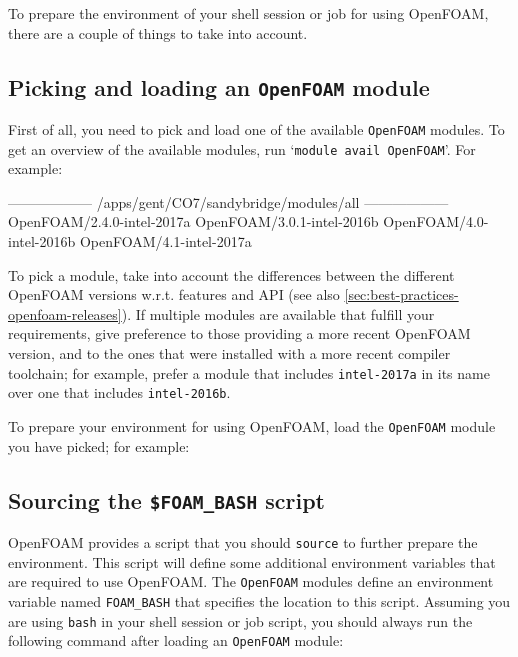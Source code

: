 To prepare the environment of your shell session or job for using OpenFOAM,
there are a couple of things to take into account.

\subsection{Picking and loading an \texttt{OpenFOAM} module}
First of all, you need to pick and load one of the available \lstinline|OpenFOAM| modules.
To get an overview of the available modules, run `\lstinline|module avail OpenFOAM|'. For example:

\begin{prompt}

------------------ /apps/gent/CO7/sandybridge/modules/all ------------------
   OpenFOAM/2.4.0-intel-2017a     OpenFOAM/3.0.1-intel-2016b
   OpenFOAM/4.0-intel-2016b       OpenFOAM/4.1-intel-2017a
\end{prompt}

To pick a module, take into account the differences between the different OpenFOAM versions w.r.t. features and
API (see also \autoref{sec:best-practices-openfoam-releases}).
If multiple modules are available that fulfill your requirements, give preference to those providing a more recent
OpenFOAM version, and to the ones that were installed with a more recent compiler toolchain; for example, prefer
a module that includes \lstinline|intel-2017a| in its name over one that includes
\lstinline|intel-2016b|.

To prepare your environment for using OpenFOAM, load the \lstinline|OpenFOAM| module you have picked; for example:
\begin{prompt}
\end{prompt}

\subsection{Sourcing the \texttt{\$FOAM\_BASH} script}

OpenFOAM provides a script that you should \lstinline|source| to further prepare the environment.
This script will define some additional environment variables that are required to use OpenFOAM.
The \lstinline|OpenFOAM| modules define an environment variable named \lstinline|FOAM_BASH|
that specifies the location to this script.
Assuming you are using \lstinline|bash| in your shell session or job script,
you should always run the following command after loading an \lstinline|OpenFOAM| module:

